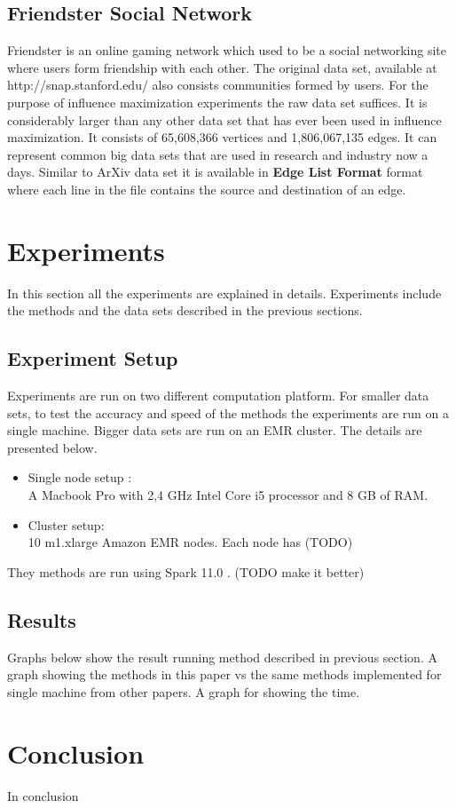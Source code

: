 \documentclass[english]{tktltiki}
\begin{document}
\subsection{Friendster Social Network}
Friendster is an online gaming network which used to be a social networking site where users form friendship with each other. The original data set, available at http://snap.stanford.edu/ also consists communities formed by users. For the purpose of influence maximization experiments the raw data set suffices. It is considerably larger than any other data set that has ever been used in influence maximization. It consists of 65,608,366 vertices and 1,806,067,135 edges. It can represent common big data sets that are used in research and industry now a days. Similar to ArXiv data set it is available in \textbf{Edge List Format} format where each line in the file contains the source and destination of an edge.

\section{Experiments}
In this section all the experiments are explained in details. Experiments include the methods and the data sets described in the previous sections. 
\subsection{Experiment Setup}
Experiments are run on two different computation platform. For smaller data sets, to test the accuracy and speed of the methods the experiments are run on a single machine. Bigger data sets are run on an EMR cluster. The details are presented below. 

\begin{itemize}
\item Single node setup : \\
A Macbook Pro with 2,4 GHz Intel Core i5 processor and 8 GB of RAM. 
\item Cluster setup: \\
10 m1.xlarge Amazon EMR nodes. Each node has (TODO)

\end{itemize}
They methods are run using Spark 11.0 . (TODO make it better)

\subsection{Results}
Graphs below show the result running method described in previous section. 
A graph showing the methods in this paper vs the same methods implemented for single machine from other papers.
A graph for showing the time.


\section{Conclusion}
In conclusion
\pagebreak





\lastpage
\appendices
\pagestyle{empty}
\end{document}
